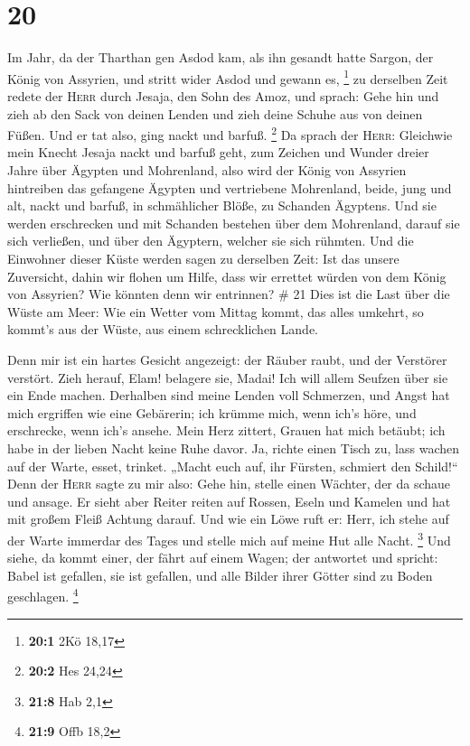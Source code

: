 \hypertarget{section-10}{%
\section{20}\label{section-10}}

 Im Jahr, da der Tharthan gen Asdod kam, als ihn gesandt
hatte Sargon, der König von Assyrien, und stritt wider Asdod und gewann
es, \footnote{\textbf{20:1} 2Kö 18,17}  zu derselben Zeit
redete der \textsc{Herr} durch Jesaja, den Sohn des Amoz, und sprach:
Gehe hin und zieh ab den Sack von deinen Lenden und zieh deine Schuhe
aus von deinen Füßen. Und er tat also, ging nackt und barfuß.
\footnote{\textbf{20:2} Hes 24,24}  Da sprach der
\textsc{Herr}: Gleichwie mein Knecht Jesaja nackt und barfuß geht, zum
Zeichen und Wunder dreier Jahre über Ägypten und Mohrenland,
 also wird der König von Assyrien hintreiben das gefangene
Ägypten und vertriebene Mohrenland, beide, jung und alt, nackt und
barfuß, in schmählicher Blöße, zu Schanden Ägyptens.  Und
sie werden erschrecken und mit Schanden bestehen über dem Mohrenland,
darauf sie sich verließen, und über den Ägyptern, welcher sie sich
rühmten.  Und die Einwohner dieser Küste werden sagen zu
derselben Zeit: Ist das unsere Zuversicht, dahin wir flohen um Hilfe,
dass wir errettet würden von dem König von Assyrien? Wie könnten denn
wir entrinnen? \# 21  Dies ist die Last über die Wüste am
Meer: Wie ein Wetter vom Mittag kommt, das alles umkehrt, so kommt's aus
der Wüste, aus einem schrecklichen Lande.

 Denn mir ist ein hartes Gesicht angezeigt: der Räuber
raubt, und der Verstörer verstört. Zieh herauf, Elam! belagere sie,
Madai! Ich will allem Seufzen über sie ein Ende machen. 
Derhalben sind meine Lenden voll Schmerzen, und Angst hat mich ergriffen
wie eine Gebärerin; ich krümme mich, wenn ich's höre, und erschrecke,
wenn ich's ansehe.  Mein Herz zittert, Grauen hat mich
betäubt; ich habe in der lieben Nacht keine Ruhe davor. 
Ja, richte einen Tisch zu, lass wachen auf der Warte, esset, trinket.
„Macht euch auf, ihr Fürsten, schmiert den Schild!{}`` 
Denn der \textsc{Herr} sagte zu mir also: Gehe hin, stelle einen
Wächter, der da schaue und ansage.  Er sieht aber Reiter
reiten auf Rossen, Eseln und Kamelen und hat mit großem Fleiß Achtung
darauf.  Und wie ein Löwe ruft er: Herr, ich stehe auf der
Warte immerdar des Tages und stelle mich auf meine Hut alle Nacht.
\footnote{\textbf{21:8} Hab 2,1}  Und siehe, da kommt
einer, der fährt auf einem Wagen; der antwortet und spricht: Babel ist
gefallen, sie ist gefallen, und alle Bilder ihrer Götter sind zu Boden
geschlagen. \footnote{\textbf{21:9} Offb 18,2}


